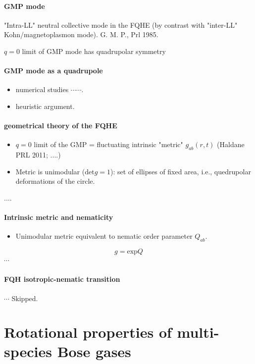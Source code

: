 \documentclass{article}
\numberwithin{equation}{subsection} %
\theoremstyle{definition}
\begin{document}
\paragraph{GMP mode} "Intra-LL" neutral collective mode in the FQHE (by
contrast with "inter-LL" Kohn/magnetoplasmon mode). G. M. P., Prl 1985.

$q=0$ limit of GMP mode has quadrupolar symmetry
\paragraph{GMP mode as a quadrupole}

\begin{itemize}
    \item numerical studies $\cdots \cdots$.
    \item heuristic argument.
\end{itemize}
\paragraph{geometrical theory of the FQHE}
\begin{itemize}
    \item $q=0$ limit of the GMP = fluctuating intrinsic "metric"
        $g_{ab}(r,t)$ (Haldane PRL 2011; ....)
    \item Metric is unimodular ($\mathrm{det} g = 1$): set of ellipses of
        fixed area, i.e., quedrupolar deformations of the circle.
\end{itemize}
....
\paragraph{Intrinsic metric and nematicity}
\begin{itemize}
    \item Unimodular metric equivalent to nematic order parameter
        $Q_{ab}$.
\end{itemize}
$$ g = \mathrm{exp}Q$$
$\cdots$

\paragraph{FQH isotropic-nematic transition} $\cdots$
Skipped.

\section{Rotational properties of multi-species Bose gases}
\label{sec:Rotational-properties-of-multi-species-Bose-gases}
\end{document}
